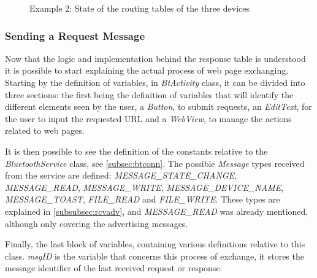 \begin{figure}[ht]
   \noindent{}
	\caption{\label{fig:example1.0} Example 2: State of the routing tables of the three devices}
\end{figure}

\subsubsection{Sending a Request Message}
\label{subsubsec:sendrqt}

Now that the logic and implementation behind the response table is understood it is possible to start explaining the actual process of web page exchanging. Starting by the definition of variables, in \textit{BtActivity} class, it can be divided into three sections: the first being the definition of variables that will identify the different elements seen by the user, a \textit{Button}, to submit requests, an \textit{EditText}, for the user to input the requested \gls{URL} and a \textit{WebView}, to manage the actions related to web pages.

It is then possible to see the definition of the constants relative to the \textit{BluetoothService} class, see \ref{subsec:btconn}. The possible \textit{Message} types received from the service are defined: \textit{MESSAGE\_STATE\_CHANGE}, \textit{MESSAGE\_READ}, \textit{MESSAGE\_WRITE}, \textit{MESSAGE\_DEVICE\_NAME}, \textit{MESSAGE\_TOAST}, \textit{FILE\_READ} and \textit{FILE\_WRITE}. These types are explained in \ref{subsubsec:rcvadv}, and \textit{MESSAGE\_READ} was already mentioned, although only covering the advertising messages.

Finally, the last block of variables, containing various definitions relative to this class. \textit{msgID} is the variable that concerns this process of exchange, it stores the message identifier of the last received request or response.


